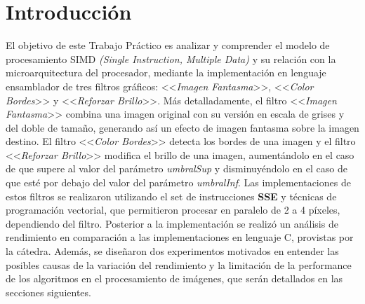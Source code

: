 \documentclass[a4paper]{article}
\begin{document}
\thispagestyle{empty}

\maketitle
\newpage

\thispagestyle{empty}
\vfill


\thispagestyle{empty}
\vspace{3cm}
\tableofcontents
\newpage


\newpage

\section{Introducción}

\justify
El objetivo de este Trabajo Práctico es analizar y comprender el modelo de procesamiento SIMD \textit{(Single Instruction, Multiple Data)} y su relación con la microarquitectura del procesador, mediante la implementación en lenguaje ensamblador de tres filtros gráficos: <<\textit{Imagen Fantasma}>>, <<\textit{Color Bordes}>> y <<\textit{Reforzar Brillo}>>. 
\justify
Más detalladamente, el filtro <<\textit{Imagen Fantasma}>> combina una imagen original con su versión en escala de grises y del doble de tamaño, generando así un  efecto de imagen fantasma sobre la imagen destino. El filtro <<\textit{Color Bordes}>> detecta los bordes de una  imagen y el filtro <<\textit{Reforzar Brillo}>> modifica el brillo de una imagen, aumentándolo en el caso de que  supere al valor del parámetro \textit{umbralSup} y disminuyéndolo en el caso de que esté por debajo del valor  del parámetro \textit{umbralInf}.
\justify
\indent Las implementaciones de estos filtros se realizaron utilizando el set de instrucciones \textbf{SSE} y técnicas de programación vectorial, que permitieron procesar en paralelo de 2 a 4 píxeles, dependiendo del filtro. Posterior a la implementación se realizó un análisis de rendimiento en comparación a las implementaciones en lenguaje C, provistas por la cátedra. Además, se diseñaron dos experimentos motivados en entender las posibles causas de la variación del rendimiento y la limitación de la performance de los algoritmos en el procesamiento de imágenes, que serán detallados en las secciones siguientes.  
\end{document}

